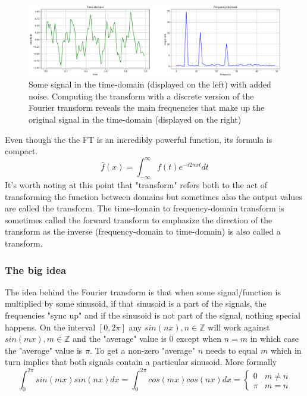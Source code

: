 \begin{figure}[ht]
    \centering
    \includegraphics[width=\textwidth]{./images/transform.png}
    \caption{Some signal in the time-domain (displayed on the left) with added noise. Computing the transform with a discrete version of the Fourier transform reveals the main frequencies that make up the original signal in the time-domain (displayed on the right)\label{fig:transform}}
\end{figure}

Even though the the FT is an incredibly powerful function, its formula is compact. 
$$\hat{f}(x) = \int_{-\infty}^{\infty} f(t)e^{-i2\pi x t} dt$$
It's worth noting at this point that "transform" refers both to the act of transforming the function between domains but sometimes also the output values are called the transform. The time-domain to frequency-domain transform is sometimes called the forward transform to emphasize the direction of the transform as the inverse (frequency-domain to time-domain) is also called a transform.

\subsubsection{The big idea}
The idea behind the Fourier transform is that when some signal/function is multiplied by some sinusoid, if that sinusoid is a part of the signals, the frequencies "sync up" and if the sinusoid is not part of the signal, nothing special happens. On the interval $[0, 2\pi]$ any $sin(nx), n\in\mathbb{Z}$ will work against $sin(mx), m\in\mathbb{Z}$ and the "average" value is 0 except when $n=m$ in which case the "average" value is $\pi$. To get a non-zero "average" $n$ needs to equal $m$ which in turn implies that both signals contain a particular sinusoid. More formally 
\[ \int_0^{2\pi} sin(mx)sin(nx)dx = \int_0^{2\pi} cos(mx)cos(nx)dx= 
\begin{cases} %
      0 & m\neq n \\
      \pi & m=n
   \end{cases} 
\]

